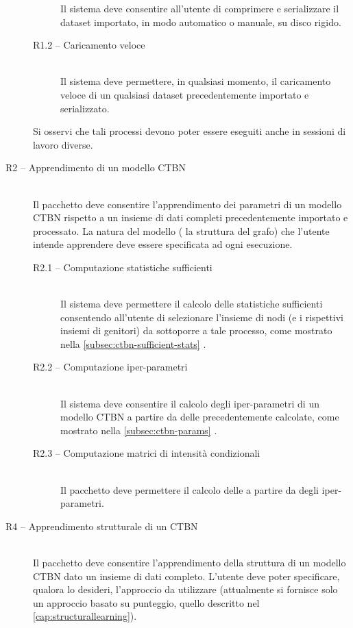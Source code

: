\begin{description}
\begin{description}
		Il sistema deve consentire all'utente di comprimere e serializzare il dataset importato, in modo automatico o manuale, su disco rigido.
		\item[R1.2 -- Caricamento veloce] \hfill \\
		Il sistema deve permettere, in qualsiasi momento, il caricamento veloce di un qualsiasi dataset precedentemente importato e serializzato.
		\end{description}
		Si osservi che tali processi devono poter essere eseguiti anche in sessioni di lavoro diverse.
	\item[R2 -- Apprendimento di un modello CTBN] \hfill \\
	Il pacchetto deve consentire l'apprendimento dei parametri di un modello \acs{CTBN} rispetto a un insieme di dati completi precedentemente importato e processato. La natura del modello (\ie{} la struttura del grafo) che l'utente intende apprendere deve essere specificata ad ogni esecuzione.
		\begin{description}
		\item[R2.1 -- Computazione statistiche sufficienti] \hfill \\
		Il sistema deve permettere il calcolo delle statistiche sufficienti consentendo all'utente di selezionare l'insieme di nodi (e i rispettivi insiemi di genitori) da sottoporre a tale processo, come mostrato nella \autoref{subsec:ctbn-sufficient-stats} .
		\item[R2.2 -- Computazione iper-parametri] \hfill \\
		Il sistema deve consentire il calcolo degli iper-parametri di un modello \acs{CTBN} a partire da delle \stas{} precedentemente calcolate, come mostrato nella \autoref{subsec:ctbn-params} .
		\item[R2.3 -- Computazione matrici di intensità condizionali] \hfill \\
		Il pacchetto deve permettere il calcolo delle \im{} a partire da degli iper-parametri.
		\end{description}
	\item[R4 -- Apprendimento strutturale di un CTBN] \hfill \\
	Il pacchetto deve consentire l'apprendimento della struttura di un modello \acs{CTBN} dato un insieme di dati completo. L'utente deve poter specificare, qualora lo desideri, l'approccio da utilizzare (attualmente si fornisce solo un approccio basato su punteggio, quello descritto nel \vref{cap:structurallearning}).

\end{description}
